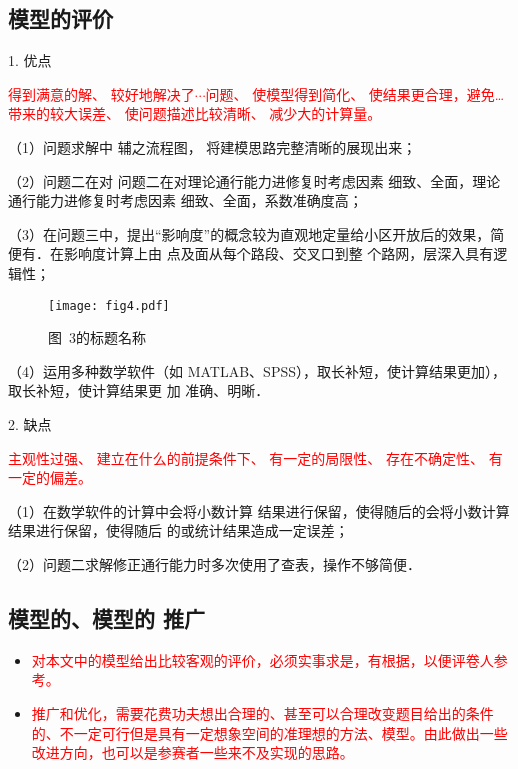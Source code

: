 \documentclass[12pt,a4paper]{mcmthesis}
\begin{document}
\subsection{模型的评价}


1. 优点

\textcolor{red}{得到满意的解、
较好地解决了$\cdots$问题、
使模型得到简化、
使结果更合理，避免…带来的较大误差、
使问题描述比较清晰、
减少大的计算量。
}

（1）问题求解中 辅之流程图， 将建模思路完整清晰的展现出来；

（2）问题二在对 问题二在对理论通行能力进修复时考虑因素 细致、全面，理论通行能力进修复时考虑因素
 细致、全面，系数准确度高；

（3）在问题三中，提出“影响度”的概念较为直观地定量给小区开放后的效果，简便有．在影响度计算上由
点及面从每个路段、交叉口到整 个路网，层深入具有逻辑性；

\begin{figure}[h!t]
\centerline{\texttt{[image: fig4.pdf]}}
\caption{\song\wuhao 图~3的标题名称}
\end{figure}


（4）运用多种数学软件（如 MATLAB、SPSS），取长补短，使计算结果更加），取长补短，使计算结果更
加 准确、明晰．

2. 缺点

\textcolor{red}{主观性过强、
建立在什么的前提条件下、
有一定的局限性、
存在不确定性、
有一定的偏差。
}

（1）在数学软件的计算中会将小数计算 结果进行保留，使得随后的会将小数计算 结果进行保留，使得随后
的或统计结果造成一定误差；

（2）问题二求解修正通行能力时多次使用了查表，操作不够简便．

\subsection{模型的、模型的 推广}

\begin{itemize}

\item \textcolor{red}{对本文中的模型给出比较客观的评价，必须实事求是，有根据，以便评卷人参考。}

\item \textcolor{red}{推广和优化，需要花费功夫想出合理的、甚至可以合理改变题目给出的条件的、不一定可行但是具有一定想象空间的准理想的方法、模型。由此做出一些改进方向，也可以是参赛者一些来不及实现的思路。}
\end{itemize}
\end{document}

